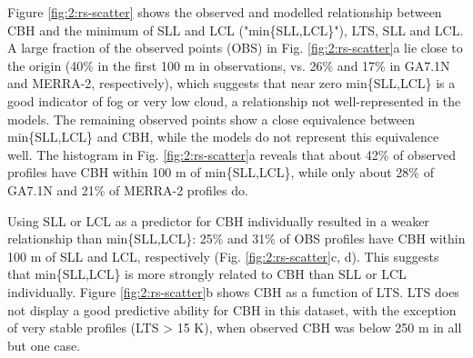 Figure \ref{fig:2:rs-scatter} shows the observed and modelled relationship
between CBH and the minimum of SLL and LCL ("min\{SLL,LCL\}"), LTS, SLL and
LCL. A large fraction of the observed points (OBS) in Fig.
\ref{fig:2:rs-scatter}a lie close to the origin (40\% in the first 100 m in
observations, vs. 26\% and 17\% in GA7.1N and MERRA-2, respectively), which
suggests that near zero min\{SLL,LCL\} is a good indicator of fog or very low
cloud, a relationship not well-represented in the models. The remaining
observed points show a close equivalence between min\{SLL,LCL\} and CBH, while
the models do not represent this equivalence well.  The histogram in Fig.
\ref{fig:2:rs-scatter}a reveals that about 42\% of observed profiles have CBH
within 100 \unit{m} of min\{SLL,LCL\}, while only about 28\% of GA7.1N and 21\%
of MERRA-2 profiles do.

Using SLL or LCL as a predictor for CBH individually resulted in a weaker
relationship than min\{SLL,LCL\}: 25\% and 31\% of OBS profiles have CBH within
100 \unit{m} of SLL and LCL, respectively (Fig. \ref{fig:2:rs-scatter}c, d).
This suggests that min\{SLL,LCL\} is more strongly related to CBH than SLL or LCL
individually. Figure \ref{fig:2:rs-scatter}b shows CBH as a function of LTS. LTS
does not display a good predictive ability for CBH in this dataset, with the
exception of very stable profiles (LTS > 15 K), when observed CBH was below 250
\unit{m} in all but one case.

